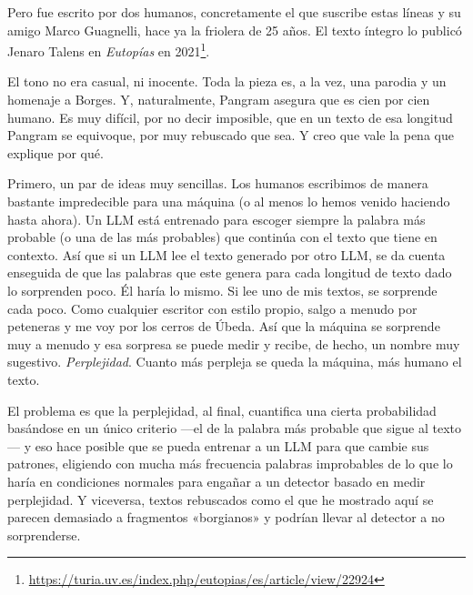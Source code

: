 \documentclass[11pt,a4paper]{article}
\begin{document}
Pero fue escrito por dos humanos, concretamente el que suscribe estas líneas y su amigo Marco Guagnelli, hace ya la friolera de 25 años. El texto íntegro lo publicó Jenaro Talens en \emph{Eutopías} en 2021\footnote{\url{https://turia.uv.es/index.php/eutopias/es/article/view/22924}}.

El tono no era casual, ni inocente. Toda la pieza es, a la vez, una parodia y un homenaje a Borges. Y, naturalmente, Pangram asegura que es cien por cien humano. Es muy difícil, por no decir imposible, que en un texto de esa longitud Pangram se equivoque, por muy rebuscado que sea. Y creo que vale la pena que explique por qué.

Primero, un par de ideas muy sencillas. Los humanos escribimos de manera bastante impredecible para una máquina (o al menos lo hemos venido haciendo hasta ahora). Un LLM está entrenado para escoger siempre la palabra más probable (o una de las más probables) que continúa con el texto que tiene en contexto. Así que si un LLM lee el texto generado por otro LLM, se da cuenta enseguida de que las palabras que este genera para cada longitud de texto dado lo sorprenden poco. Él haría lo mismo. Si lee uno de mis textos, se sorprende cada poco. Como cualquier escritor con estilo propio, salgo a menudo por peteneras y me voy por los cerros de Úbeda. Así que la máquina se sorprende muy a menudo y esa sorpresa se puede medir y recibe, de hecho, un nombre muy sugestivo. \emph{Perplejidad}. Cuanto más perpleja se queda la máquina, más humano el texto.

El problema es que la perplejidad, al final, cuantifica una cierta probabilidad basándose en un único criterio ---el de la palabra más probable que sigue al texto--- y eso hace posible que se pueda entrenar a un LLM para que cambie sus patrones, eligiendo con mucha más frecuencia palabras improbables de lo que lo haría en condiciones normales para engañar a un detector basado en medir perplejidad. Y viceversa, textos rebuscados como el que he mostrado aquí se parecen demasiado a fragmentos «borgianos» y podrían llevar al detector a no sorprenderse.
\end{document}
